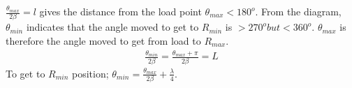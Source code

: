 $\frac{\theta_{max}}{2\beta}=l$ gives the distance from the load point $\theta_{max} < 180^o$. From the diagram, $\theta_{min}$ indicates that the angle moved to get to $R_{min}$ is $>270^o but <360^o$. $\theta_{max}$ is therefore the angle moved to get from load to $R_{max}$.
\begin{align}
\frac{\theta_{min}}{2\beta}=\frac{\theta_{max} + \pi}{2\beta} = L
\end{align}
To get to $R_{min}$ position; $\theta_{min} = \frac{\theta_{max}}{2\beta} + \frac{\lambda}{4}.$ 